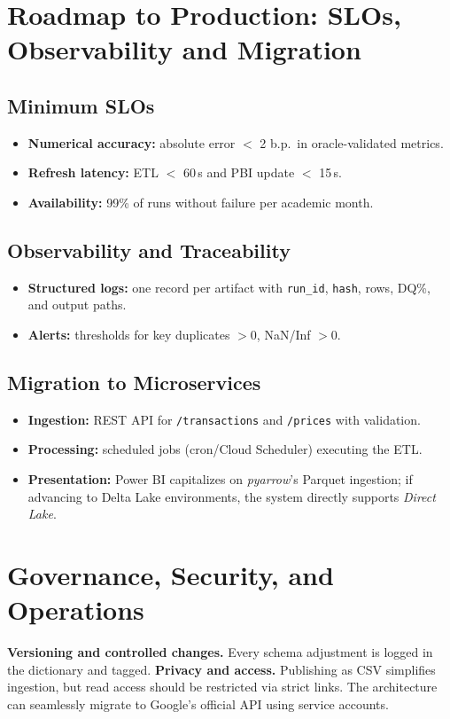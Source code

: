 \documentclass[conference]{IEEEtran}
\begin{document}
\section{Roadmap to Production: SLOs, Observability and Migration}
\subsection{Minimum SLOs}
\begin{itemize}
    \item \textbf{Numerical accuracy:} absolute error $<$ 2 b.p.\ in oracle-validated metrics.
    \item \textbf{Refresh latency:} ETL $<$ 60\,s and PBI update $<$ 15\,s.
    \item \textbf{Availability:} 99\% of runs without failure per academic month.
\end{itemize}

\subsection{Observability and Traceability}
\begin{itemize}
    \item \textbf{Structured logs:} one record per artifact with \texttt{run\_id}, \texttt{hash}, rows, DQ\%, and output paths.
    \item \textbf{Alerts:} thresholds for key duplicates $>$0, NaN/Inf $>$0.
\end{itemize}

\subsection{Migration to Microservices}
\begin{itemize}
    \item \textbf{Ingestion:} REST API for \texttt{/transactions} and \texttt{/prices} with validation.
    \item \textbf{Processing:} scheduled jobs (cron/Cloud Scheduler) executing the ETL.
    \item \textbf{Presentation:} Power BI capitalizes on \emph{pyarrow}'s Parquet ingestion; if advancing to Delta Lake environments, the system directly supports \emph{Direct Lake}.
\end{itemize}

\section{Governance, Security, and Operations}
\textbf{Versioning and controlled changes.} Every schema adjustment is logged in the dictionary and tagged.
\textbf{Privacy and access.} Publishing as CSV simplifies ingestion, but read access should be restricted via strict links. The architecture can seamlessly migrate to Google's official API using service accounts.
\end{document}
